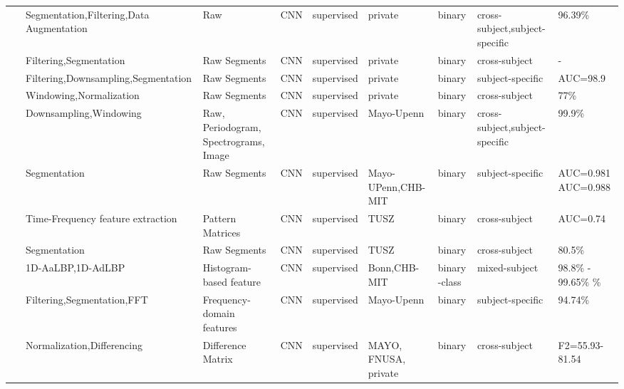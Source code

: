 \begin{table*}[ht]
\begin{tabular}{p{0.4cm}p{2.8cm}p{2cm}p{1.5cm}p{1.9cm}p{1.9cm}p{0.8cm}p{1.8cm}p{2cm}}
~\cite{Seizure87} & Segmentation,Filtering,\newline Data Augmentation & Raw & CNN & supervised & private & binary & cross-subject,\newline subject-specific & 96.39\% \\
~\cite{Seizure88} & Filtering,Segmentation & Raw Segments & CNN & supervised & private & binary & cross-subject & - \\
~\cite{Seizure89} & Filtering,Downsampling,\newline Segmentation & Raw Segments & CNN & supervised & private & binary & subject-specific & AUC=98.9 \\
~\cite{Seizure90} & Windowing,Normalization & Raw Segments & CNN & supervised & private & binary & cross-subject & 77\% \\
~\cite{Seizure91} & Downsampling,Windowing & Raw, Periodogram, Spectrograms, Image & CNN & supervised & Mayo-Upenn & binary & cross-subject,\newline subject-specific & 99.9\% \\
~\cite{Seizure92} & Segmentation & Raw Segments & CNN & supervised & Mayo-UPenn,\newline CHB-MIT & binary & subject-specific & AUC=0.981 \newline
AUC=0.988 \\
~\cite{Seizure93} & Time-Frequency feature extraction & Pattern Matrices & CNN & supervised & TUSZ & binary & cross-subject & AUC=0.74 \\
~\cite{Seizure94} & Segmentation & Raw Segments & CNN & supervised & TUSZ & binary & cross-subject & 80.5\% \\
~\cite{Seizure95} & 1D-AaLBP,1D-AdLBP & Histogram-based feature & CNN & supervised & Bonn,\newline CHB-MIT & binary \newline 
5-class & mixed-subject & 98.8\% - 99.65\% \newline
99.11\% \\
~\cite{Seizure96} & Filtering,Segmentation,\newline FFT & Frequency-domain features & CNN & supervised & Mayo-Upenn & binary & subject-specific & 94.74\% \\
~\cite{tudmnet} & Normalization,Differencing & Difference Matrix & CNN & supervised  & MAYO, FNUSA, private & binary & cross-subject & F2=55.93-81.54 \\
\hline
\end{tabular}
\end{table*}


